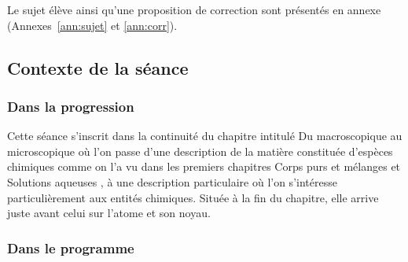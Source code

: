 \documentclass[12pt,a4paper, fleqn]{report}
\begin{document}
Le sujet élève ainsi qu'une proposition de correction sont présentés en annexe (Annexes~\ref{ann:sujet} et \ref{ann:corr}).

\subsection{Contexte de la séance}

\subsubsection{Dans la progression}

Cette séance s'inscrit dans la continuité du chapitre intitulé \og Du macroscopique au microscopique \fg{} où l'on passe d'une description de la matière constituée d'espèces chimiques comme on l'a vu dans les premiers chapitres \og Corps purs et mélanges \fg{} et \og Solutions aqueuses \fg{}, à une description particulaire où l'on s'intéresse particulièrement aux entités chimiques.
Située à la fin du chapitre, elle arrive juste avant celui sur l'atome et son noyau.

\subsubsection{Dans le programme}
\end{document}
